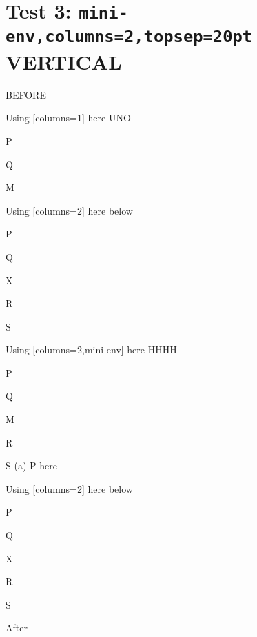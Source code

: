 \documentclass[10pt]{article}
\begin{document}
\section{Test 3: \texttt{mini-env,columns=2,topsep=20pt} VERTICAL}

BEFORE
\begin{enumext}[columns=2]
\item Using [columns=1] here UNO

  \begin{enumext}[columns=1,topsep=20pt]%
     \item  P \item Q \item M %
  \end{enumext}

\item Using [columns=2] here below

\begin{enumext}[columns=2,topsep=20pt]%
     \item  P \item Q \item X  \item R \item S
  \end{enumext}

\columnbreak

\item Using [columns=2,mini-env] here HHHH

  \begin{enumext}[columns=2,mini-env={0.4\linewidth},topsep=20pt]%
    \item  P \item Q \item M \item R \item S
    \miniright
    (a) P here
  \end{enumext}

\item Using [columns=2] here below

\begin{enumext}[columns=2,topsep=20pt]%
     \item  P \item Q \item X  \item R \item S
  \end{enumext}

\end{enumext}
After
\end{document}
